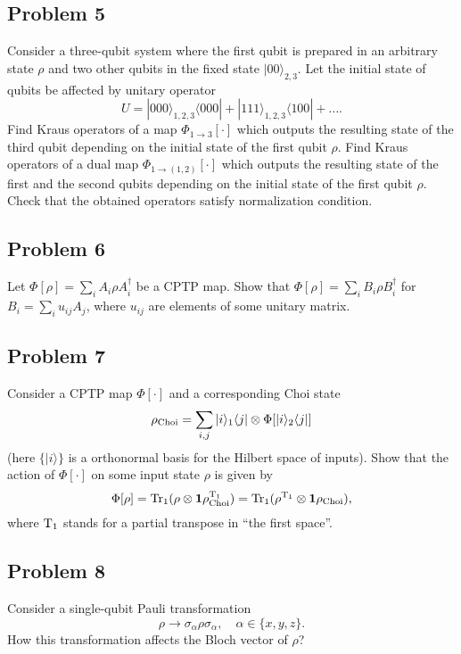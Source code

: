 \documentclass[a4paper,10pt]{article}
\newcommand{\ket}[1]{|#1\rangle}
\newcommand{\bra}[1]{\langle#1|}
\newcommand{\tr}{\ensuremath{{\rm Tr}}}
\begin{document}
\subsection*{Problem 5}
Consider a three-qubit system where the first qubit is prepared in an arbitrary state $\rho$ and two other qubits in the fixed state $\ket{00}_{2,3}$.
Let the initial state of qubits be affected by unitary operator
\begin{equation}
	U = \ket{000}_{1,2,3}\bra{000} +  \ket{111}_{1,2,3}\bra{100} + \ldots.
\end{equation}
Find Kraus operators of a map $\Phi_{1\rightarrow 3}[\cdot]$ which outputs the resulting state of the third qubit depending on the initial state of the first qubit $\rho$.
Find Kraus operators of a dual map $\Phi_{1\rightarrow (1,2)}[\cdot]$ which outputs the resulting state of the first and the second qubits depending on the initial state of the first qubit $\rho$.
Check that the obtained operators satisfy normalization condition.


\subsection*{Problem 6}
Let $\Phi[\rho]=\sum_{i}A_{i}\rho A_{i}^{\dagger}$ be a CPTP map.
Show that $\Phi[\rho]=\sum_{i}B_{i}\rho B_{i}^{\dagger}$ for $B_{i}=\sum_{i}u_{ij}A_{j}$, where $u_{ij}$ are elements of some unitary matrix.


\subsection*{Problem 7}
Consider a CPTP map $\Phi[\cdot]$ and a corresponding Choi state
\begin{equation}
	\rho_{\rm Choi} = \sum_{i,j} \ket{i}_{1}\bra{j}\otimes\Phi[\ket{i}_{2}\bra{j}]
\end{equation}
(here $\{\ket{i}\}$ is a orthonormal basis for the Hilbert space of inputs).
Show that the action of $\Phi[\cdot]$ on some input state $\rho$ is given by
\begin{equation}
	\Phi[\rho]=\tr_{1}(\rho\otimes {\bf 1} \rho_{\rm Choi}^{\rm T_{1}})=
	\tr_{1}(\rho^{\rm T_{1}}\otimes {\bf 1} \rho_{\rm Choi}),
\end{equation}
where ${\rm T}_{1}$ stands for a partial transpose in ``the first space''.


\subsection*{Problem 8}
Consider a single-qubit Pauli transformation 
\begin{equation}
	\rho\rightarrow \sigma_{\alpha}\rho\sigma_{\alpha}, \quad \alpha\in\{x,y,z\}.
\end{equation}
How this transformation affects the Bloch vector of $\rho$?
\end{document}
